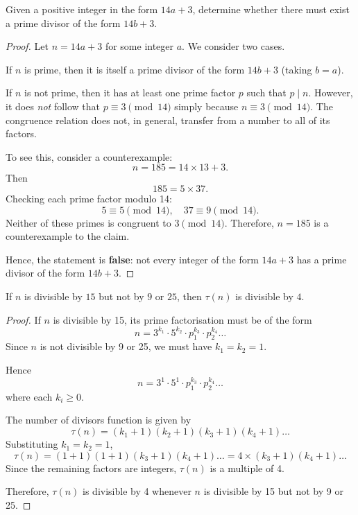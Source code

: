 \documentclass{tufte-handout}
\begin{document}

\begin{question}

Given a positive integer in the form \( 14a + 3 \), determine whether there must exist 
a prime divisor of the form \( 14b + 3 \).

\begin{proof}
Let \( n = 14a + 3 \) for some integer \( a \). We consider two cases.

If \( n \) is prime, then it is itself a prime divisor of the form \( 14b + 3 \) 
(taking \( b = a \)).

If \( n \) is not prime, then it has at least one prime factor \( p \) such that \( p \mid n \).  
However, it does \emph{not} follow that \( p \equiv 3 \pmod{14} \) simply because 
\( n \equiv 3 \pmod{14} \). The congruence relation does not, in general, transfer 
from a number to all of its factors.

To see this, consider a counterexample:
\[
n = 185 = 14 \times 13 + 3.
\]
Then
\[
185 = 5 \times 37.
\]
Checking each prime factor modulo 14:
\[
5 \equiv 5 \pmod{14}, \quad 37 \equiv 9 \pmod{14}.
\]
Neither of these primes is congruent to \(3 \pmod{14}\).  
Therefore, \( n = 185 \) is a counterexample to the claim.

Hence, the statement is \textbf{false}:  
not every integer of the form \( 14a + 3 \) has a prime divisor of the form \( 14b + 3 \).

\end{proof}

\end{question}


\begin{question}

If \( n \) is divisible by \( 15 \) but not by \( 9 \text{ or } 25 \), then \( \tau(n) \)
is divisible by \( 4 \).

\begin{proof}
If \( n \) is divisible by 15, its prime factorisation must be of the form
\[
n = 3^{k_1} \cdot 5^{k_2} \cdot p_1^{k_3} \cdot p_2^{k_4} \ldots
\]
Since \( n \) is not divisible by 9 or 25, we must have \( k_1 = k_2 = 1 \).

Hence
\[
n = 3^1 \cdot 5^1 \cdot p_1^{k_3} \cdot p_2^{k_4} \ldots
\]
where each \( k_i \geq 0 \).

The number of divisors function is given by
\[
\tau(n) = (k_1 + 1)(k_2 + 1)(k_3 + 1)(k_4 + 1)\ldots
\]
Substituting \( k_1 = k_2 = 1 \),
\[
\tau(n) = (1 + 1)(1 + 1)(k_3 + 1)(k_4 + 1)\ldots = 4 \times (k_3 + 1)(k_4 + 1)\ldots
\]
Since the remaining factors are integers, \( \tau(n) \) is a multiple of 4.

Therefore, \( \tau(n) \) is divisible by 4 whenever \( n \) is divisible by 15 but not by 9 or 25.

\end{proof}

\end{question}
\end{document}
